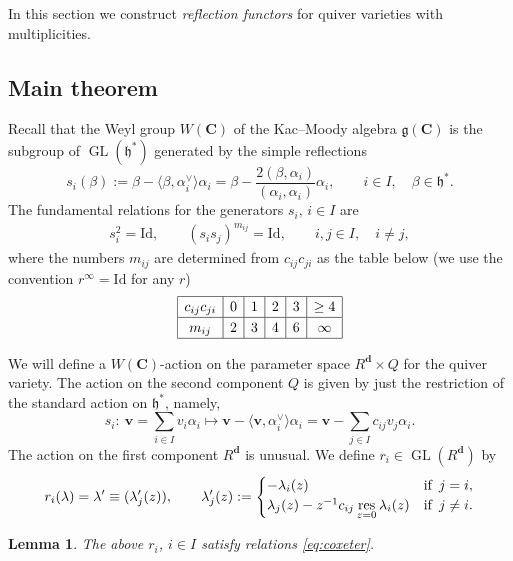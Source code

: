 \documentclass[pdftex]{sigma}
\numberwithin{equation}{section}
\newtheorem{Lemma}[Theorem]{Lemma}
\theoremstyle{definition}
\newcommand{\GL}{\operatorname{GL}} %
\newcommand{\g}{\mathfrak{g}} %
\newcommand{\h}{\mathfrak{h}} %
\newcommand{\unit}{\mathrm{Id}}
\newcommand{\bC}{\mathbf{C}} %
\newcommand{\bv}{\mathbf{v}}
\newcommand{\res}{\operatorname*{res}}
\newcommand{\ved}{\mathbf{d}}
\newcommand{\hquad}{\hspace{.5em}}
\begin{document}
In this section we construct {\em reflection functors}
for quiver varieties with multiplicities.

\subsection{Main theorem}\label{subsec:main}

Recall that the Weyl group $W(\bC)$ of the Kac--Moody algebra $\g(\bC)$
is the subgroup of $\GL(\h^*)$ generated by the simple ref\/lections
\[
s_i(\beta) := \beta -
\langle \beta, \alpha^\vee_i \rangle \alpha_i
= \beta - \frac{2(\beta,\alpha_i)}{(\alpha_i,\alpha_i)}\alpha_i,
\qquad i \in I,\quad \beta \in \h^*.
\]
The fundamental relations for the generators
$s_i,\, i \in I$ are
\begin{gather}\label{eq:coxeter}
s_i^2 =\unit, \qquad
(s_is_j)^{m_{ij}} =\unit, \qquad i,j \in I,\quad i \neq j,
\end{gather}
where the numbers $m_{ij}$ are determined from $c_{ij}c_{ji}$
as the table below
(we use the convention $r^\infty=\unit$ for any $r$)
$$
{\renewcommand{\arraystretch}{1.2}
\begin{array}{|c|c|c|c|c|c|}
\hline
c_{ij}c_{ji} & 0 & 1 & 2 & 3 & \geq 4 \\ \hline
m_{ij} & 2 & 3 & 4 & 6 & \infty \\ \hline
\end{array}}
$$

We will def\/ine a $W(\bC)$-action on the parameter space
$R^\ved \times Q$ for the quiver variety.
The action on the second component $Q$ is given by just
the restriction of the standard action on $\h^*$, namely,
\[
s_i \colon \ \bv=\sum_{i \in I} v_i \alpha_i \longmapsto
\bv - \langle \bv, \alpha^\vee_i \rangle \alpha_i
=\bv - \sum_{j \in I} c_{ij}v_j \alpha_i.
\]
The action on the f\/irst component $R^\ved$ is unusual.
We def\/ine $r_i \in \GL(R^\ved)$ by
\[
r_i(\lambda) = \lambda' \equiv (\lambda'_j(z)), \qquad
\lambda'_j(z) :=
\begin{cases}
-\lambda_i(z) & \text{if}\hquad j =i, \\
\lambda_j(z) - z^{-1}c_{ij} \res\limits_{z=0} \lambda_i(z) & \text{if}\hquad j \neq i.
\end{cases}
\]

\begin{Lemma}\label{lem:rel}
The above $r_i$, $i \in I$ satisfy relations \eqref{eq:coxeter}.
\end{Lemma}
\end{document}
